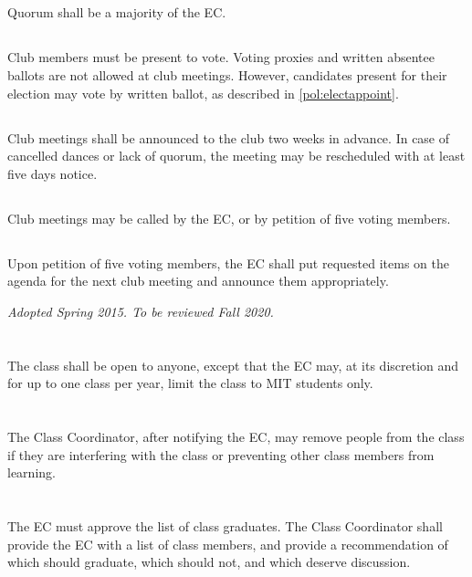 \documentclass{bylaws}
\newcommand{\sptimes}[2]{\emph{Adopted #1. To be reviewed #2.}}
\begin{document}
\subsection{}Quorum shall be a majority of the EC.

\subsection{}Club members must be present to vote. Voting proxies and written absentee ballots are not allowed at club meetings. However, candidates present for their election may vote by written ballot, as described in \ref{pol:electappoint}.
\subsection{}Club meetings shall be announced to the club two weeks in advance. In case of cancelled dances or lack of quorum, the meeting may be rescheduled with at least five days notice.
\subsection{}Club meetings may be called by the EC, or by petition of five voting members.
\subsection{}Upon petition of five voting members, the EC shall put requested items on the agenda for the next club meeting and announce them appropriately.


\label{pol:class}
\sptimes{Spring 2015}{Fall 2020}
\section{}The class shall be open to anyone, except that the EC may, at its discretion and for up to one class per year, limit the class to MIT students only.
\section{}The Class Coordinator, after notifying the EC, may remove people from the class if they are interfering with the class or preventing other class members from learning.
\section{}The EC must approve the list of class graduates. The Class Coordinator shall provide the EC with a list of class members, and provide a recommendation of which should graduate, which should not, and which deserve discussion.
\end{document}
